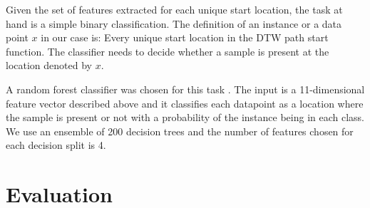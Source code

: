 \documentclass{article}
\begin{document}
Given the set of features extracted for each unique start location, the task at hand is a simple binary classification. The definition of an instance or a data point $x$ in our case is: Every unique start location in the DTW path start function. The classifier needs to decide whether a sample is present at the location denoted by $x$.

A random forest classifier was chosen for this task \cite{breiman2001random}. The input is a 11-dimensional feature vector described above and it classifies each datapoint as a location where the sample is present or not with a probability of the instance being in each class. We use an ensemble of 200 decision trees and the number of features chosen for each decision split is 4.


\section{Evaluation}
\label{eval}
\end{document}
